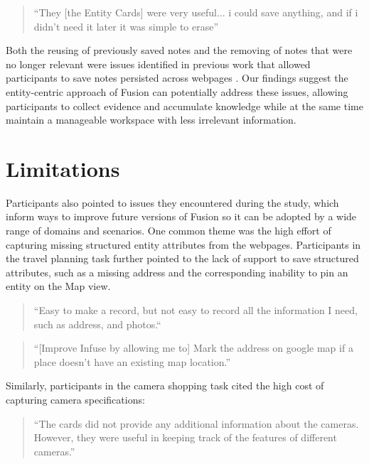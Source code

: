 \begin{quote}
``They [the Entity Cards] were very useful... i could save anything, and if i didn't need it later it was simple to erase''
\end{quote}

\noindent Both the reusing of previously saved notes and the removing of notes that were no longer relevant were issues identified in previous work that allowed participants to save notes persisted across webpages \cite{notetoself}. Our findings suggest the entity-centric approach of Fusion can potentially address these issues, allowing participants to collect evidence and accumulate knowledge while at the same time maintain a manageable workspace with less irrelevant information. 

\section*{Limitations}

Participants also pointed to issues they encountered during the study, which inform ways to improve future versions of Fusion so it can be adopted by a wide range of domains and scenarios.
One common theme was the high effort of capturing missing structured entity attributes from the webpages. Participants in the travel planning task further pointed to the lack of support to save structured attributes, such as a missing address and the corresponding inability to pin an entity on the Map view. 

\begin{quote}
``Easy to make a record, but not easy to record all the information I need, such as address, and photos.``
\end{quote}

\begin{quote}
``[Improve Infuse by allowing me to] Mark the address on google map if a place doesn't have an existing map location.'' 
\end{quote}

\noindent Similarly, participants in the camera shopping task cited the high cost of capturing camera specifications:

\begin{quote}
``The cards did not provide any additional information about the cameras. However, they were useful in keeping track of the features of different cameras.''
\end{quote}

